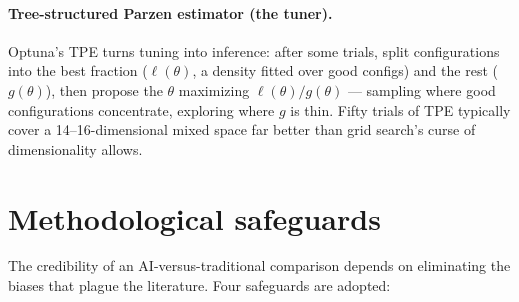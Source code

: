 \paragraph{Tree-structured Parzen estimator (the tuner).} Optuna's TPE turns tuning into
inference: after some trials, split configurations into the best fraction ($\ell(\theta)$,
a density fitted over good configs) and the rest ($g(\theta)$), then propose the $\theta$
maximizing $\ell(\theta)/g(\theta)$ --- sampling where good configurations concentrate,
exploring where $g$ is thin. Fifty trials of TPE typically cover a 14--16-dimensional
mixed space far better than grid search's curse of dimensionality allows.

\section{Methodological safeguards}
\label{sec:safeguards}

The credibility of an AI-versus-traditional comparison depends on eliminating the biases that
plague the literature. Four safeguards are adopted:

